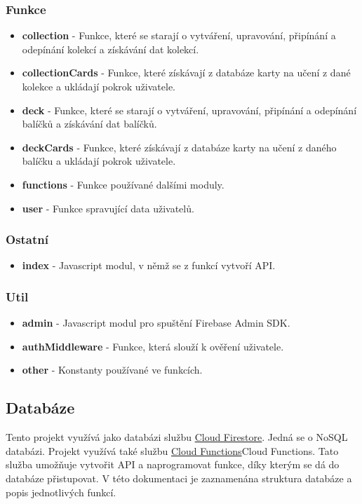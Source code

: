\documentclass[a4paper,12pt]{article}
\begin{document}
\subsubsection*{Funkce}
\begin{itemize}
\item \textbf{collection} - Funkce, které se starají o vytváření, upravování, připínání a odepínání kolekcí a získávání dat kolekcí.
\item \textbf{collectionCards} - Funkce, které získávají z databáze karty na učení z dané kolekce a ukládají pokrok uživatele.
\item \textbf{deck} - Funkce, které se starají o vytváření, upravování, připínání a odepínání balíčků a získávání dat balíčků.
\item \textbf{deckCards} - Funkce, které získávají z databáze karty na učení z daného balíčku a ukládají pokrok uživatele.
\item \textbf{functions} - Funkce používané dalšími moduly.
\item \textbf{user} - Funkce spravující data uživatelů.
\end{itemize}

\subsubsection*{Ostatní}
\begin{itemize}
\item \textbf{index} - Javascript modul, v němž se z funkcí vytvoří API.
\end{itemize}

\subsubsection*{Util}
\begin{itemize}
\item \textbf{admin} - Javascript modul pro spuštění Firebase Admin SDK.
\item \textbf{authMiddleware} - Funkce, která slouží k ověření uživatele.
\item \textbf{other} - Konstanty používané ve funkcích.
\end{itemize}

\subsection{Databáze}
Tento projekt využívá jako databázi službu \href{https://firebase.google.com/docs/firestore}{Cloud Firestore}. Jedná se o NoSQL databázi. Projekt využívá také službu \href{https://firebase.google.com/docs/functions}{Cloud Functions}Cloud Functions. Tato služba umožňuje vytvořit API a naprogramovat funkce, díky kterým se dá do databáze přistupovat. V této dokumentaci je zaznamenána struktura databáze a popis jednotlivých funkcí.
\end{document}
